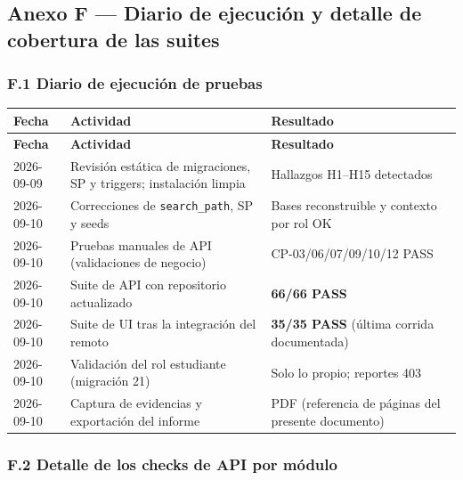 \documentclass[11pt,a4paper]{article}
\begin{document}
\subsection*{Anexo F --- Diario de ejecución y detalle de cobertura de las suites}


\subsubsection*{F.1 Diario de ejecución de pruebas}


{\small
\begin{longtable}{|p{}|p{}|p{}|}
\rowcolor{UTECblue}\color{white}\bfseries Fecha & \color{white}\bfseries Actividad & \color{white}\bfseries Resultado \\ \hline
\endfirsthead
\rowcolor{UTECblue}\color{white}\bfseries Fecha & \color{white}\bfseries Actividad & \color{white}\bfseries Resultado \\ \hline
\endhead
2026-09-09 & Revisión estática de migraciones, SP y triggers; instalación limpia & Hallazgos H1--H15 detectados \\ \hline
2026-09-10 & Correcciones de \texttt{search\_path}, SP y seeds & Bases reconstruible y contexto por rol OK \\ \hline
2026-09-10 & Pruebas manuales de API (validaciones de negocio) & CP-03/06/07/09/10/12 PASS \\ \hline
2026-09-10 & Suite de API con repositorio actualizado & \textbf{66/66 PASS} \\ \hline
2026-09-10 & Suite de UI tras la integración del remoto & \textbf{35/35 PASS} (última corrida documentada) \\ \hline
2026-09-10 & Validación del rol estudiante (migración 21) & Solo lo propio; reportes 403 \\ \hline
2026-09-10 & Captura de evidencias y exportación del informe & PDF (referencia de páginas del presente documento) \\ \hline
\end{longtable}}


\subsubsection*{F.2 Detalle de los checks de API por módulo}
\end{document}
